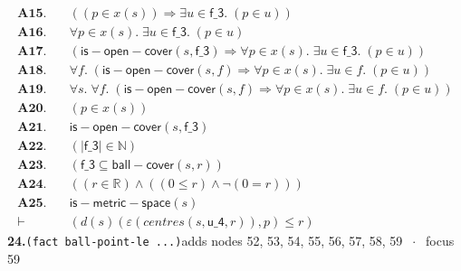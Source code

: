 \documentclass[11pt]{article}
\begin{document}
\begin{align*}
  \mathbf{A15.}\quad & ((p \in x(s)) \Rightarrow \exists u \in \mathsf{f\_3}.\; (p \in u)) \\
  \mathbf{A16.}\quad & \forall p \in x(s).\; \exists u \in \mathsf{f\_3}.\; (p \in u) \\
  \mathbf{A17.}\quad & (\mathsf{is{-}open{-}cover}(s, \mathsf{f\_3}) \Rightarrow \forall p \in x(s).\; \exists u \in \mathsf{f\_3}.\; (p \in u)) \\
  \mathbf{A18.}\quad & \forall f.\; (\mathsf{is{-}open{-}cover}(s, f) \Rightarrow \forall p \in x(s).\; \exists u \in f.\; (p \in u)) \\
  \mathbf{A19.}\quad & \forall s.\; \forall f.\; (\mathsf{is{-}open{-}cover}(s, f) \Rightarrow \forall p \in x(s).\; \exists u \in f.\; (p \in u)) \\
  \mathbf{A20.}\quad & (p \in x(s)) \\
  \mathbf{A21.}\quad & \mathsf{is{-}open{-}cover}(s, \mathsf{f\_3}) \\
  \mathbf{A22.}\quad & (|\mathsf{f\_3}| \in \mathbb{N}) \\
  \mathbf{A23.}\quad & (\mathsf{f\_3} \subseteq \mathsf{ball{-}cover}(s, r)) \\
  \mathbf{A24.}\quad & ((r \in \mathbb{R}) \wedge ((0 \leq r) \wedge \neg (0 = r))) \\
  \mathbf{A25.}\quad & \mathsf{is{-}metric{-}space}(s) \\
  \vdash\quad & (d(s)(\varepsilon(\mathit{centres}(s, \mathsf{u\_4}, r)), p) \leq r)
\end{align*}
\medskip\noindent\textbf{24.}\quad \texttt{(fact ball-point-le ...)}\hfill{\small adds nodes 52, 53, 54, 55, 56, 57, 58, 59 $\;\cdot\;$ focus 59}\\[2pt]
\end{document}
